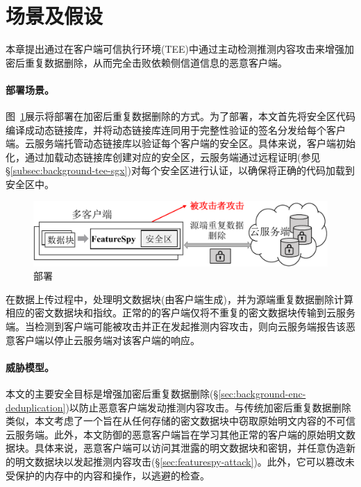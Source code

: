 \section{场景及假设}
\label{sec:featurespy-setting}

本章提出\sysnameF 通过在客户端可信执行环境(TEE)中通过主动检测推测内容攻击来增强加密后重复数据删除，从而完全击败依赖侧信道信息的恶意客户端。

\paragraph*{部署场景。}图~\ref{fig:featurespy-model}展示将\sysnameF 部署在加密后重复数据删除的方式。为了部署\sysnameF，本文首先将安全区代码编译成动态链接库\cite{sgx}，并将动态链接库连同用于完整性验证的签名分发给每个客户端。云服务端托管动态链接库以验证每个客户端的安全区。具体来说，客户端初始化\sysnameF，通过加载动态链接库创建对应的安全区，云服务端通过远程证明\cite{sgx}(参见\S\ref{subsec:background-tee-sgx})对每个安全区进行认证，以确保将正确的代码加载到安全区中。

\begin{figure}[!htb]
    \centering
    \includegraphics[width=\textwidth]{pic/featurespy/deployment.pdf}
    \caption{部署\sysnameF}
    \label{fig:featurespy-model}
\end{figure}

在数据上传过程中，\sysnameF 处理明文数据块(由客户端生成)，并为源端重复数据删除计算相应的密文数据块和指纹。正常的的客户端仅将不重复的密文数据块传输到云服务端。当\sysnameF 检测到客户端可能被攻击并正在发起推测内容攻击，则向云服务端报告该恶意客户端以停止云服务端对该客户端的响应。

\paragraph*{威胁模型。}本文的主要安全目标是增强加密后重复数据删除(\S\ref{sec:background-enc-deduplication})以防止恶意客户端发动推测内容攻击。与传统加密后重复数据删除\cite{bellare2013MLE}类似，本文考虑了一个旨在从任何存储的密文数据块中窃取原始明文内容的不可信云服务端。此外，本文防御的恶意客户端旨在学习其他正常的客户端的原始明文数据块。具体来说，恶意客户端可以访问其泄露的明文数据块和密钥，并任意伪造新的明文数据块以发起推测内容攻击(\S\ref{sec:featurespy-attack})。此外，它可以篡改未受保护的内存中的内容和操作，以逃避\sysnameF 的检查。


